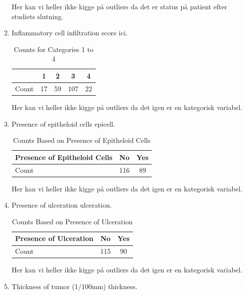 \begin{enumerate}
\noindent Her kan vi heller ikke kigge på outliers da det er status på patient efter studiets slutning.
\item Inflammatory cell infiltration score ici. \newline
\begin{table}[h!]
    \centering
    \begin{tabular}{|c|c|c|c|c|}
        \hline
        & 1 & 2 & 3 & 4 \\
        \hline
        Count & 17 & 59 & 107 & 22 \\
        \hline
    \end{tabular}
    \caption{Counts for Categories 1 to 4}
    \label{tab:categories}
\end{table}
Her kan vi heller ikke kigge på outliers da det igen er en kategorisk variabel.
\item Presence of epitheloid cells epicell. \newline
\begin{table}[h!]
    \centering
    \begin{tabular}{|l|c|c|}
        \hline
        Presence of Epitheloid Cells & No & Yes \\
        \hline
        Count & 116 & 89 \\
        \hline
    \end{tabular}
    \caption{Counts Based on Presence of Epitheloid Cells}
    \label{tab:epitheloid_cells}
\end{table}
Her kan vi heller ikke kigge på outliers da det igen er en kategorisk variabel.
\item Presence of ulceration ulceration. \newline
\begin{table}[h!]
    \centering
    \begin{tabular}{|l|c|c|}
        \hline
        Presence of Ulceration & No & Yes \\
        \hline
        Count & 115 & 90 \\
        \hline
    \end{tabular}
    \caption{Counts Based on Presence of Ulceration}
    \label{tab:ulceration}
\end{table}
Her kan vi heller ikke kigge på outliers da det igen er en kategorisk variabel.

\newpage
\item Thickness of tumor (1/100mm) thickness.


\end{enumerate}
